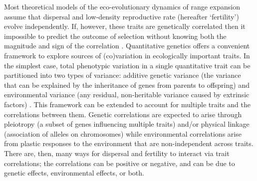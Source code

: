 \documentclass[11pt]{article}
\begin{document}
Most theoretical models of the eco-evolutionary dynamics of range expansion assume that dispersal and low-density reproductive rate (hereafter `fertility') evolve independently.
If, however, these traits are genetically correlated then it impossible to predict the outcome of selection without knowing both the magnitude and sign of the correlation \citep{lande_measurement_1983,chenoweth2010contribution}.
Quantitative genetics offers a convenient framework to explore sources of (co)variation in ecologically important traits.
In the simplest case, total phenotypic variation in a single quantitative trait can be partitioned into two types of variance: additive genetic variance (the variance that can be explained by the inheritance of genes from parents to offspring) and environmental variance (any residual, non-heritable variance caused by extrinsic factors) \citep{lynch_genetics_1998,kruuk_estimating_2004,wilson_ecologists_2010}.
This framework can be extended to account for multiple traits and the correlations between them.
Genetic correlations are expected to arise through pleiotropy (a subset of genes influencing multiple traits) and/or physical linkage (association of alleles on chromosomes) \citep{roff_evolutionary_1997} while environmental correlations arise from plastic responses to the environment that are non-independent across traits.
There are, then, many ways for dispersal and fertility to interact via trait correlations; the correlations can be positive or negative, and can be due to genetic effects, environmental effects, or both.
\end{document}
